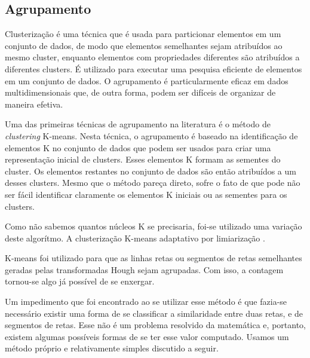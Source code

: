 \documentclass[10pt,twocolumn,letterpaper]{article}
\begin{document}
\subsection{Agrupamento}

	Clusterização é uma técnica que é usada para particionar elementos em um conjunto
de dados, de modo que elementos semelhantes sejam atribuídos ao mesmo cluster,
enquanto elementos com propriedades diferentes são atribuídos a diferentes clusters.
É utilizado para executar uma pesquisa eficiente de elementos em um conjunto de dados.
O agrupamento é particularmente eficaz em dados multidimensionais que, de outra forma,
podem ser difíceis de organizar de maneira efetiva.

	Uma das primeiras técnicas de agrupamento na literatura é o método de {\em clustering}
K-means. Nesta técnica, o agrupamento é baseado na identificação de elementos K no
conjunto de dados que podem ser usados para criar uma representação inicial de clusters.
Esses elementos K formam as sementes do cluster. Os elementos restantes no conjunto de
dados são então atribuídos a um desses clusters. Mesmo que o método pareça direto, sofre
o fato de que pode não ser fácil identificar claramente os elementos K iniciais ou as sementes
para os clusters.

	Como não sabemos quantos núcleos K se precisaria, foi-se utilizado uma variação deste
algorítmo. A clusterização K-means adaptativo por limiarização \cite{kmeans}.


	K-means foi utilizado para que as linhas retas ou segmentos de retas semelhantes
geradas pelas transformadas Hough sejam agrupadas. Com isso, a contagem tornou-se
algo já possível de se enxergar.

	Um impedimento que foi encontrado ao se utilizar esse método é que fazia-se
necessário existir uma forma de se classificar a similaridade entre duas retas, e de segmentos
de retas. Esse não é um problema resolvido da matemática e, portanto, existem algumas
possíveis formas de se ter esse valor computado. Usamos um método próprio e relativamente
simples discutido a seguir.
\end{document}

